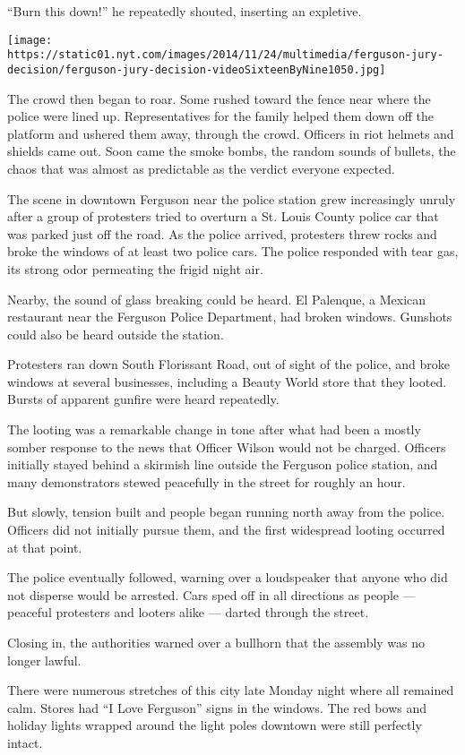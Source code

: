 ``Burn this down!'' he repeatedly shouted, inserting an expletive.

\texttt{[image: https://static01.nyt.com/images/2014/11/24/multimedia/ferguson-jury-decision/ferguson-jury-decision-videoSixteenByNine1050.jpg]}

The crowd then began to roar. Some rushed toward the fence near where
the police were lined up. Representatives for the family helped them
down off the platform and ushered them away, through the crowd. Officers
in riot helmets and shields came out. Soon came the smoke bombs, the
random sounds of bullets, the chaos that was almost as predictable as
the verdict everyone expected.

The scene in downtown Ferguson near the police station grew increasingly
unruly after a group of protesters tried to overturn a St. Louis County
police car that was parked just off the road. As the police arrived,
protesters threw rocks and broke the windows of at least two police
cars. The police responded with tear gas, its strong odor permeating the
frigid night air.

Nearby, the sound of glass breaking could be heard. El Palenque, a
Mexican restaurant near the Ferguson Police Department, had broken
windows. Gunshots could also be heard outside the station.

Protesters ran down South Florissant Road, out of sight of the police,
and broke windows at several businesses, including a Beauty World store
that they looted. Bursts of apparent gunfire were heard repeatedly.

The looting was a remarkable change in tone after what had been a mostly
somber response to the news that Officer Wilson would not be charged.
Officers initially stayed behind a skirmish line outside the Ferguson
police station, and many demonstrators stewed peacefully in the street
for roughly an hour.

But slowly, tension built and people began running north away from the
police. Officers did not initially pursue them, and the first widespread
looting occurred at that point.

The police eventually followed, warning over a loudspeaker that anyone
who did not disperse would be arrested. Cars sped off in all directions
as people --- peaceful protesters and looters alike --- darted through
the street.

Closing in, the authorities warned over a bullhorn that the assembly was
no longer lawful.

There were numerous stretches of this city late Monday night where all
remained calm. Stores had ``I Love Ferguson'' signs in the windows. The
red bows and holiday lights wrapped around the light poles downtown were
still perfectly intact.


